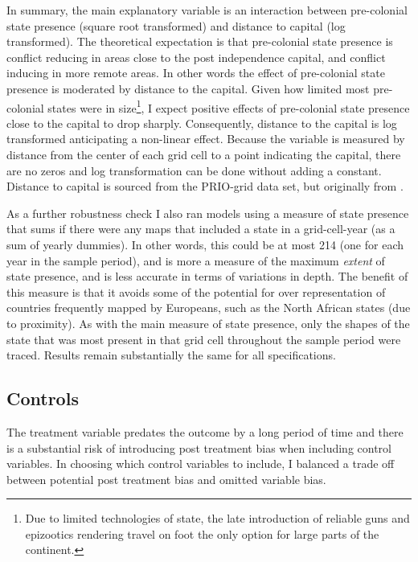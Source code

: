 In summary, the main explanatory variable is an interaction between pre-colonial
state presence (square root transformed) and distance to capital (log
transformed). The theoretical expectation is that pre-colonial state presence is
conflict reducing in areas close to the post independence capital, and conflict
inducing in more remote areas. In other words the effect of pre-colonial state
presence is moderated by distance to the capital. Given how limited most
pre-colonial states were in size\footnote{Due to limited technologies of state,
the late introduction of reliable guns and epizootics rendering travel on foot
the only option for large parts of the continent.}, I expect positive effects of
pre-colonial state presence close to the capital to drop sharply. Consequently,
distance to the capital is log transformed anticipating a non-linear effect.
Because the variable is measured by distance from the center of each grid cell
to a point indicating the capital, there are no zeros and log transformation can
be done without adding a constant. Distance to capital is sourced from the
PRIO-grid data set, but originally from \citet{Weidmann2010a}.

As a further robustness check I also ran models using a measure of state
presence that sums if there were any maps that included a state in a
grid-cell-year (as a sum of yearly dummies). In other words, this could be at
most 214 (one for each year in the sample period), and is more a measure of the
maximum \textit{extent} of state presence, and is less accurate in terms of
variations in depth. The benefit of this measure is that it avoids some of the
potential for over representation of countries frequently mapped by Europeans,
such as the North African states (due to proximity). As with the main measure of
state presence, only the shapes of the state that was most present in that grid
cell throughout the sample period were traced. Results remain substantially the
same for all specifications.

\subsection{Controls} \label{Controls}

The treatment variable predates the outcome by a long
period of time and there is a substantial risk of introducing post treatment bias
when including control variables. In choosing which control variables to
include, I balanced a trade off between potential post treatment bias
and omitted variable bias. 

